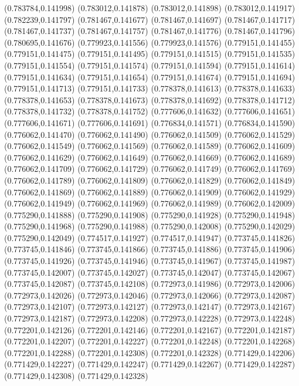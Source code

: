 (0.783784,0.141998)
(0.783012,0.141878)
(0.783012,0.141898)
(0.783012,0.141917)
(0.782239,0.141797)
(0.781467,0.141677)
(0.781467,0.141697)
(0.781467,0.141717)
(0.781467,0.141737)
(0.781467,0.141757)
(0.781467,0.141776)
(0.781467,0.141796)
(0.780695,0.141676)
(0.779923,0.141556)
(0.779923,0.141576)
(0.779151,0.141455)
(0.779151,0.141475)
(0.779151,0.141495)
(0.779151,0.141515)
(0.779151,0.141535)
(0.779151,0.141554)
(0.779151,0.141574)
(0.779151,0.141594)
(0.779151,0.141614)
(0.779151,0.141634)
(0.779151,0.141654)
(0.779151,0.141674)
(0.779151,0.141694)
(0.779151,0.141713)
(0.779151,0.141733)
(0.778378,0.141613)
(0.778378,0.141633)
(0.778378,0.141653)
(0.778378,0.141673)
(0.778378,0.141692)
(0.778378,0.141712)
(0.778378,0.141732)
(0.778378,0.141752)
(0.777606,0.141632)
(0.777606,0.141651)
(0.777606,0.141671)
(0.777606,0.141691)
(0.776834,0.141571)
(0.776834,0.141590)
(0.776062,0.141470)
(0.776062,0.141490)
(0.776062,0.141509)
(0.776062,0.141529)
(0.776062,0.141549)
(0.776062,0.141569)
(0.776062,0.141589)
(0.776062,0.141609)
(0.776062,0.141629)
(0.776062,0.141649)
(0.776062,0.141669)
(0.776062,0.141689)
(0.776062,0.141709)
(0.776062,0.141729)
(0.776062,0.141749)
(0.776062,0.141769)
(0.776062,0.141789)
(0.776062,0.141809)
(0.776062,0.141829)
(0.776062,0.141849)
(0.776062,0.141869)
(0.776062,0.141889)
(0.776062,0.141909)
(0.776062,0.141929)
(0.776062,0.141949)
(0.776062,0.141969)
(0.776062,0.141989)
(0.776062,0.142009)
(0.775290,0.141888)
(0.775290,0.141908)
(0.775290,0.141928)
(0.775290,0.141948)
(0.775290,0.141968)
(0.775290,0.141988)
(0.775290,0.142008)
(0.775290,0.142029)
(0.775290,0.142049)
(0.774517,0.141927)
(0.774517,0.141947)
(0.773745,0.141826)
(0.773745,0.141846)
(0.773745,0.141866)
(0.773745,0.141886)
(0.773745,0.141906)
(0.773745,0.141926)
(0.773745,0.141946)
(0.773745,0.141967)
(0.773745,0.141987)
(0.773745,0.142007)
(0.773745,0.142027)
(0.773745,0.142047)
(0.773745,0.142067)
(0.773745,0.142087)
(0.773745,0.142108)
(0.772973,0.141986)
(0.772973,0.142006)
(0.772973,0.142026)
(0.772973,0.142046)
(0.772973,0.142066)
(0.772973,0.142087)
(0.772973,0.142107)
(0.772973,0.142127)
(0.772973,0.142147)
(0.772973,0.142167)
(0.772973,0.142187)
(0.772973,0.142208)
(0.772973,0.142228)
(0.772973,0.142248)
(0.772201,0.142126)
(0.772201,0.142146)
(0.772201,0.142167)
(0.772201,0.142187)
(0.772201,0.142207)
(0.772201,0.142227)
(0.772201,0.142248)
(0.772201,0.142268)
(0.772201,0.142288)
(0.772201,0.142308)
(0.772201,0.142328)
(0.771429,0.142206)
(0.771429,0.142227)
(0.771429,0.142247)
(0.771429,0.142267)
(0.771429,0.142287)
(0.771429,0.142308)
(0.771429,0.142328)
